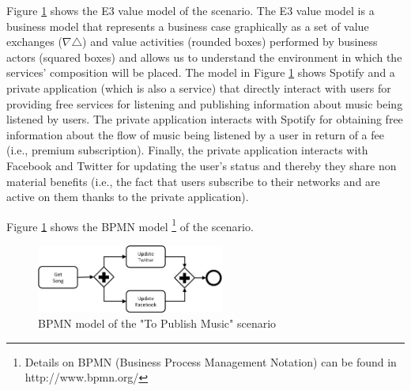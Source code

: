 Figure \ref{fig:E3valuemodel} shows the E3 value model \cite{e3value} of
the scenario. The E3 value model is a business model that represents a business case graphically as a set of value exchanges ($\nabla$$\triangle$) and value activities (rounded boxes) performed by business actors (squared boxes) and allows us to understand the environment in which the services' composition will be placed. 
The model in Figure \ref{fig:E3valuemodel} shows Spotify and a private application (which is also a service) that directly interact with users for providing free services for listening and publishing information about music being listened by users. The private application interacts with Spotify for obtaining free information about the flow of music being listened by a user in return of a fee (i.e., premium subscription). Finally, the private application interacts with Facebook and Twitter for updating the user's status and thereby they share non material benefits (i.e., the fact that users subscribe to their networks and are active on them thanks to the private application).

Figure \ref{fig:E3valuemodel} shows the BPMN model  \footnote{Details on BPMN (Business Process Management Notation) can be found in http://www.bpmn.org/} of the scenario. 


\begin{figure}
\centering
\includegraphics[width=0.55\textwidth]{figs/SC}
\caption{BPMN model of the "To Publish Music" scenario}
\label{fig:E3valuemodel}
\end{figure}


